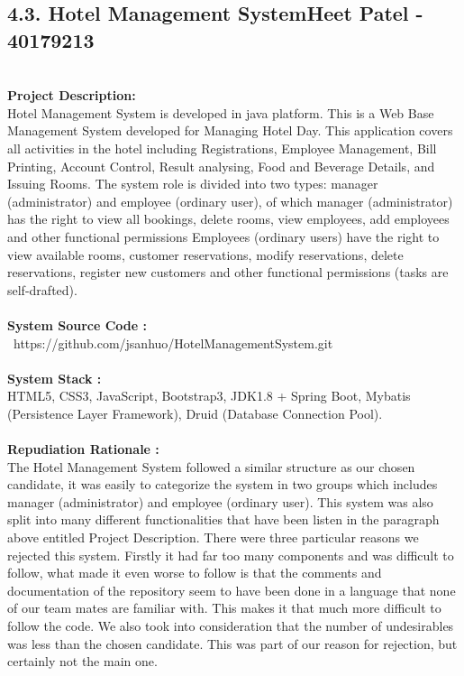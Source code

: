\documentclass[letterpaper, 11pt]{report}
\begin{document}
\subsection*{4.3. Hotel Management System\hfill {\normalsize{Heet Patel - 40179213}}} \\
\normalsize {\textbf{Project Description:}} \\
\normalsize {Hotel Management System is developed in java platform. This is a Web Base Management System developed for Managing Hotel Day. This application covers all activities in the hotel including Registrations, Employee Management, Bill Printing, Account Control, Result analysing, Food and Beverage Details, and Issuing Rooms. The system role is divided into two types: manager (administrator) and employee (ordinary user), of which manager (administrator) has the right to view all bookings, delete rooms, view employees, add employees and other functional permissions Employees (ordinary users) have the right to view available rooms, customer reservations, modify reservations, delete reservations, register new customers and other functional permissions (tasks are self-drafted).}\\
\\
\normalsize{\textbf{System Source Code :}} \\
\normalsize{\ https://github.com/jsanhuo/HotelManagementSystem.git}\\
\\
\normalsize{\textbf{System Stack :}}\\
\normalsize{HTML5, CSS3, JavaScript, Bootstrap3, JDK1.8 + Spring Boot, Mybatis (Persistence Layer Framework), Druid (Database Connection Pool).}\\
\\
\normalsize{\textbf{Repudiation Rationale : }}\\
\normalsize{The Hotel Management System followed a similar structure as our chosen candidate, it was easily to categorize the system in two groups which includes manager (administrator) and employee (ordinary user). This system was also split into many different functionalities that have been listen in the paragraph above entitled Project Description. There were three particular reasons we rejected this system. Firstly it had far too many components and was difficult to follow, what made it even worse to follow is that the comments and documentation of the repository seem to have been done in a language that none of our team mates are familiar with. This makes it that much more difficult to follow the code. We also took into consideration that the number of undesirables was less than the chosen candidate. This was part of our reason for rejection, but certainly not the main one.}
\end{document}
